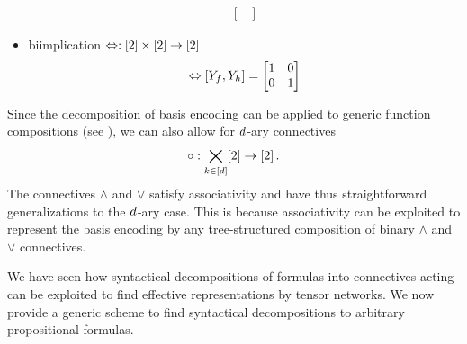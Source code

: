 \begin{example}
\begin{itemize}
\begin{align*}
\begin{bmatrix}
            \end{bmatrix}
        \end{align*}
        \item biimplication $\Leftrightarrow:  [2]\times[2] \rightarrow[2]$
        \begin{align*}
            \Leftrightarrow[Y_{f},Y_{h}]
            = \begin{bmatrix}
                  1 & 0 \\
                  0 & 1
            \end{bmatrix}
        \end{align*}
    \end{itemize}
\end{example}

\begin{remark}
    \label{rem:naryConnectives}
    Since the decomposition of basis encoding can be applied to generic function compositions (see ), we can also allow for $d$-ary connectives
    \begin{align*}
        \circ : \bigtimes_{k\in[d]} [2] \rightarrow [2] \, .
    \end{align*}
    The connectives $\land$ and $\lor$ satisfy associativity and have thus straightforward generalizations to the $d$-ary case.
    This is because associativity can be exploited to represent the basis encoding by any tree-structured composition of binary $\land$ and $\lor$ connectives.
\end{remark}



\label{sec:termClauseDecomposition}

We have seen how syntactical decompositions of formulas into connectives acting can be exploited to find effective representations by tensor networks.
We now provide a generic scheme to find syntactical decompositions to arbitrary propositional formulas.


%


